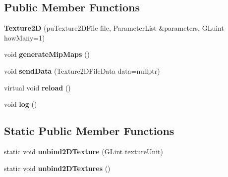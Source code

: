 \subsection*{Public Member Functions}
\begin{DoxyCompactItemize}
\item 
\hypertarget{classfillwave_1_1core_1_1Texture2D_a9a47395ba30236b153dfa81982acbcab}{}{\bfseries Texture2\+D} (pu\+Texture2\+D\+File file, Parameter\+List \&parameters, G\+Luint how\+Many=1)\label{classfillwave_1_1core_1_1Texture2D_a9a47395ba30236b153dfa81982acbcab}

\item 
\hypertarget{classfillwave_1_1core_1_1Texture2D_abc4c0153fba02c0768492023d70c10bf}{}void {\bfseries generate\+Mip\+Maps} ()\label{classfillwave_1_1core_1_1Texture2D_abc4c0153fba02c0768492023d70c10bf}

\item 
\hypertarget{classfillwave_1_1core_1_1Texture2D_a7b89e2efc4e9497c26387dc1aecd7630}{}void {\bfseries send\+Data} (Texture2\+D\+File\+Data data=nullptr)\label{classfillwave_1_1core_1_1Texture2D_a7b89e2efc4e9497c26387dc1aecd7630}

\item 
\hypertarget{classfillwave_1_1core_1_1Texture2D_a480fe548281e02cd72e8c55ed9dffdf1}{}virtual void {\bfseries reload} ()\label{classfillwave_1_1core_1_1Texture2D_a480fe548281e02cd72e8c55ed9dffdf1}

\item 
\hypertarget{classfillwave_1_1core_1_1Texture2D_a08f81b15be59c24ba3fe9fe5ddb8ef68}{}void {\bfseries log} ()\label{classfillwave_1_1core_1_1Texture2D_a08f81b15be59c24ba3fe9fe5ddb8ef68}

\end{DoxyCompactItemize}
\subsection*{Static Public Member Functions}
\begin{DoxyCompactItemize}
\item 
\hypertarget{classfillwave_1_1core_1_1Texture2D_a3cef610448d374618a71a132ce42b716}{}static void {\bfseries unbind2\+D\+Texture} (G\+Lint texture\+Unit)\label{classfillwave_1_1core_1_1Texture2D_a3cef610448d374618a71a132ce42b716}

\item 
\hypertarget{classfillwave_1_1core_1_1Texture2D_ade5197df59202be815fd2698e3d3a46c}{}static void {\bfseries unbind2\+D\+Textures} ()\label{classfillwave_1_1core_1_1Texture2D_ade5197df59202be815fd2698e3d3a46c}

\end{DoxyCompactItemize}
